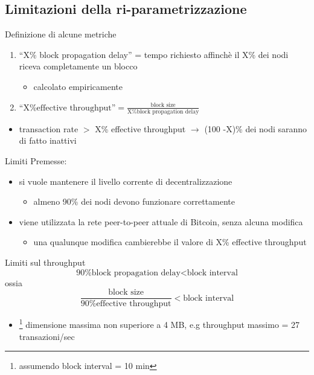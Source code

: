 \documentclass{beamer}
\begin{document}
  \subsection{Limitazioni della ri-parametrizzazione}
  \begin{frame}{Definizione di alcune metriche}
      \begin{enumerate}
          \item ``X\% block propagation delay'' = tempo richiesto affinchè il X\% dei nodi riceva completamente un blocco
          \begin{itemize}
              \item[\MVRightarrow] calcolato empiricamente
          \end{itemize}
          \item $\text{``X\% effective throughput''} = \frac{\text{block size}}{\text{X\% block propagation delay}}$
      \end{enumerate}
      \begin{itemize}
          \item transaction rate $>$ X\% effective throughput $\rightarrow$ (100 -X)\% dei nodi saranno di fatto inattivi
      \end{itemize}
  \end{frame} 
  
  
  \begin{frame}{Limiti}
    Premesse:
    \begin{itemize}
        \item si vuole mantenere il livello corrente di decentralizzazione 
        \begin{itemize}
            \item[\MVRightarrow] almeno 90\% dei nodi devono funzionare correttamente
        \end{itemize}
        \item viene utilizzata la rete peer-to-peer attuale di Bitcoin, senza alcuna modifica
        \begin{itemize}
            \item[\MVRightarrow] una qualunque modifica cambierebbe il valore di X\% effective throughput
        \end{itemize}
    \end{itemize}
    
    \begin{block}{Limiti sul throughput}
        \[ \text{90\% block propagation delay} < \text{block interval} \]
        ossia 
        \[ \frac{\text{block size}}{\text{90\% effective throughput}} < \text{block interval} \]
        \begin{itemize}
            \item[\MVRightarrow] \footnote{assumendo block interval = 10 min} dimensione massima non superiore a 4 MB, e.g throughput massimo = 27 transazioni/sec 
        \end{itemize}
    \end{block}
  \end{frame}
  
\end{document}
